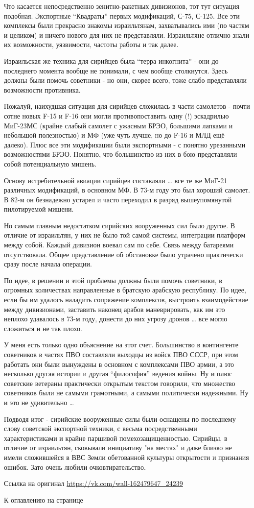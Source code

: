Что касается непосредственно зенитно-ракетных дивизионов, тот тут ситуация подобная. Экспортные “Квадраты” первых модификаций, С-75, С-125. Все эти комплексы были прекрасно знакомы израильтянам, захватывались ими (по частям и целиком) и ничего нового для них не представляли. Израильтяне отлично знали их возможности, уязвимости, частоты работы и так далее.

Израильская же техника для сирийцев была “терра инкогнита” - они до последнего момента вообще не понимали, с чем вообще столкнутся. Здесь должны были помочь советники - но они, скорее всего, тоже слабо представляли возможности противника.

Пожалуй, наихудшая ситуация для сирийцев сложилась в части самолетов - почти сотне новых F-15 и F-16 они могли противопоставить одну (!) эскадрилью МиГ-23МС (крайне слабый самолет с ужасным БРЭО, большими лапками и небольшой полезностью) и МФ (уже чуть лучше, но до F-16 и МЛД ещё далеко). Плюс все эти модификации были экспортными - с понятно урезанными возможностями БРЭО. Понятно, что большинство из них в бою представляли собой потенциальную мишень.

Основу истребительной авиации сирийцев составляли … все те же МиГ-21 различных модификаций, в основном МФ. В 73-м году это был хороший самолет. В 82-м он безнадежно устарел и часто переходил в разряд вышеупомянутой пилотируемой мишени.

Но самым главным недостатком сирийских вооруженных сил было другое. В отличие от израильтян, у них не было той самой системы, интеграции платформ между собой. Каждый дивизион воевал сам по себе. Связь между батареями отсутствовала. Общее представление об обстановке было утрачено практически сразу после начала операции.

По идее, в решении и этой проблемы должны были помочь советники, в огромных количествах направленные в братскую арабскую республику. По идее, если бы им удалось наладить сопряжение комплексов, выстроить взаимодействие между дивизионами, заставить наконец арабов маневрировать, как им это неплохо удавалось в 73-м году, донести до них угрозу дронов … все могло сложиться и не так плохо.

У меня есть только одно объяснение на этот счет. Большинство в контингенте советников в частях ПВО составляли выходцы из войск ПВО СССР, при этом работать они были вынуждены в основном с комплексами ПВО армии, а это несколько другая истории и другая “философия” ведения войны. Ну и плюс советские ветераны практически открытым текстом говорили, что множество советников были не самыми грамотными, а самыми политически надежными. Ну и это не удивительно …

Подводя итог - сирийские вооруженные силы были оснащены по последнему слову советской экспортной техники, с весьма посредственными характеристиками и крайне паршивой помехозащищенностью. Сирийцы, в отличие от израильтян, сковывали инициативу "на местах" и даже близко не имели сложившейся в ВВС Земли обетованной культуры открытости и признания ошибок. Зато очень любили очковтирательство. 


Ссылка на оригинал \url{https://vk.com/wall-162479647_24239}

К оглавлению на странице \pageref{tablecont}